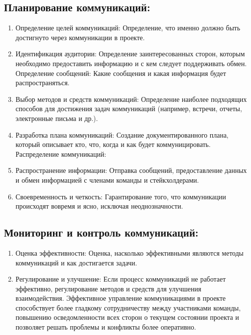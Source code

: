 \documentclass[letterpaper,10pt,russian]{sphinxmanual}
\begin{document}
\subsection{Планирование коммуникаций:}
\label{\detokenize{educational_materials/team_work_on_a_project/content:id9}}\begin{enumerate}
%
\item {} 
\sphinxAtStartPar
Определение целей коммуникаций: Определение, что именно должно быть достигнуто через коммуникации в проекте.

\item {} 
\sphinxAtStartPar
Идентификация аудитории: Определение заинтересованных сторон, которым необходимо предоставить информацию и с кем следует поддерживать обмен.
Определение сообщений: Какие сообщения и какая информация будет распространяться.

\item {} 
\sphinxAtStartPar
Выбор методов и средств коммуникаций: Определение наиболее подходящих способов для достижения задач коммуникаций (например, встречи, отчеты, электронные письма и др.).

\item {} 
\sphinxAtStartPar
Разработка плана коммуникаций: Создание документированного плана, который описывает кто, что, когда и как будет коммуницировать.
Распределение коммуникаций:

\item {} 
\sphinxAtStartPar
Распространение информации: Отправка сообщений, предоставление данных и обмен информацией с членами команды и стейкхолдерами.

\item {} 
\sphinxAtStartPar
Своевременность и четкость: Гарантирование того, что коммуникации происходят вовремя и ясно, исключая неоднозначности.

\end{enumerate}


\subsection{Мониторинг и контроль коммуникаций:}
\label{\detokenize{educational_materials/team_work_on_a_project/content:id10}}\begin{enumerate}
%
\item {} 
\sphinxAtStartPar
Оценка эффективности: Оценка, насколько эффективными являются методы коммуникаций и как достигается задачи.

\item {} 
\sphinxAtStartPar
Регулирование и улучшение: Если процесс коммуникаций не работает эффективно, регулирование методов и средств для улучшения взаимодействия.
Эффективное управление коммуникациями в проекте способствует более гладкому сотрудничеству между участниками команды, повышению осведомленности всех сторон о текущем состоянии проекта и позволяет решать проблемы и конфликты более оперативно.

\end{enumerate}
\end{document}
